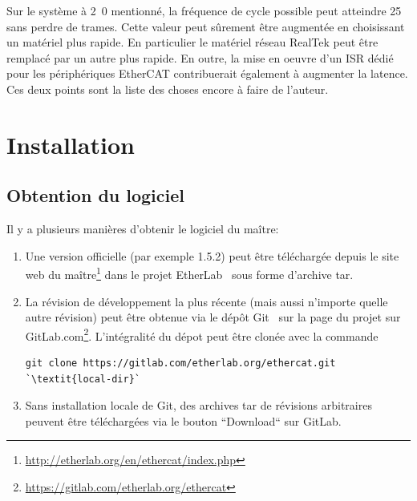 \documentclass[a4paper,12pt,BCOR6mm,bibtotoc,idxtotoc]{scrbook}
\newcommand{\masterversion}{1.5.2}
\begin{document}
Sur le syst\`eme \`a \unit{2.0}{\giga\hertz} mentionn\'e, la
fr\'equence de cycle possible peut atteindre \unit{25}{\kilo\hertz}
sans perdre de trames.  Cette valeur peut s\^urement \^etre
augment\'ee en choisissant un mat\'eriel plus rapide.  En particulier
le mat\'eriel r\'eseau RealTek peut \^etre remplac\'e par un autre
plus rapide.  En outre, la mise en oeuvre d'un ISR d\'edi\'e pour les
p\'eriph\'eriques EtherCAT contribuerait \'egalement \`a augmenter la
latence. Ces deux points sont la liste des choses encore \`a faire de
l'auteur.


\chapter{Installation}
\label{sec:installation}

\section{Obtention du logiciel}
\label{sec:getting}

Il y a plusieurs mani\`eres d'obtenir le logiciel du ma\^itre:

\begin{enumerate}

\item Une version officielle (par exemple \masterversion) peut \^etre
  t\'el\'echarg\'ee depuis le site web du
  ma\^itre\footnote{\url{http://etherlab.org/en/ethercat/index.php}}
  dans le projet EtherLab~\cite{etherlab} sous forme d'archive tar.

\item La r\'evision de d\'eveloppement la plus r\'ecente (mais aussi
  n'importe quelle autre r\'evision) peut \^etre obtenue via le
  d\'ep\^ot Git~\cite{git} sur la page du projet sur
  GitLab.com\footnote{\url{https://gitlab.com/etherlab.org/ethercat}}.
  L'int\'egralit\'e du d\'epot peut \^etre clon\'ee avec la commande

\begin{lstlisting}[breaklines=true]
 git clone https://gitlab.com/etherlab.org/ethercat.git `\textit{local-dir}`
\end{lstlisting}

\item Sans installation locale de Git, des archives tar de
  r\'evisions arbitraires peuvent \^etre t\'el\'echarg\'ees via le
  bouton ``Download`` sur GitLab.

\end{enumerate}
\end{document}
